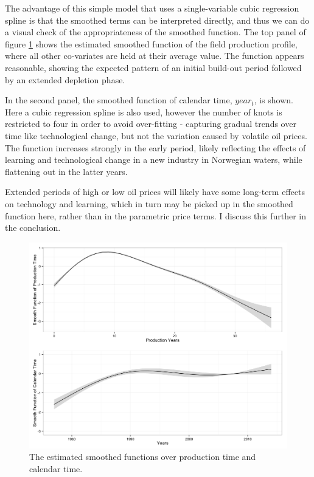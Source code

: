 \documentclass[12pt]{article}
\begin{document}
The advantage of this simple model that uses a single-variable cubic regression spline is that the smoothed terms can be interpreted directly, and thus we can do a visual check of the appropriateness of the smoothed function. The top panel of figure \ref{smooths} shows the estimated smoothed function of the field production profile, where all other co-variates are held at their average value.  The function appears reasonable, showing the expected pattern of an initial build-out period followed by an extended depletion phase. 

In the second panel, the smoothed function of calendar time, $year_t$, is shown. Here a cubic regression spline is also used, however the number of knots is restricted to four in order to avoid over-fitting - capturing gradual trends over time like technological change, but not the variation caused by volatile oil prices. The function increases strongly in the early period, likely reflecting the effects of learning and technological change in a new industry in Norwegian waters, while flattening out in the latter years. 

Extended periods of high or low oil prices will likely have some long-term effects on technology and learning, which in turn may be picked up in the smoothed function here, rather than in the parametric price terms.  I discuss this further in the conclusion.  

\begin{figure}
	\includegraphics[width=1\textwidth]{figures/smooths.png}
	\caption{The estimated smoothed functions over production time and calendar time.}
	\label{smooths}
\end{figure}
\end{document}
